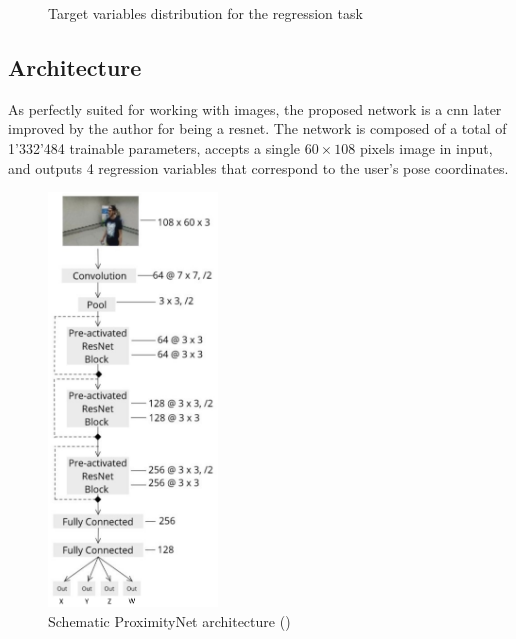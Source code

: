 \begin{figure}[!h]
\begin{center}
\begin{subfigure}[h]{0.24\textwidth}
		\end{subfigure}
	\end{center}
	\vspace{-0.5cm}
	\caption[Target variables distribution for the regression task]{Target variables distribution for the regression task}
	\label{fig:proximitynet-dataset-distribution-regr}
\end{figure}



\subsection{Architecture}
\label{subsec:proximitynet-architecture}


As perfectly suited for working with images, the proposed network is a \gls{cnn} later improved by the author for being a \gls{resnet}. The network is composed of a total of 1'332'484 trainable parameters, accepts a single $60 \times 108$ pixels image in input, and outputs 4 regression variables that correspond to the user's pose coordinates.

\begin{figure}[!h]
	\centering
	\includegraphics[width=0.4\textwidth]{"contents/images/03-proximitynet-1A"}
	\caption[Schematic ProximityNet architecture]{Schematic ProximityNet architecture (\cite{mantegazza2019visionbased})}
	\label{fig:proximitynet-architecture-1}
\end{figure}

